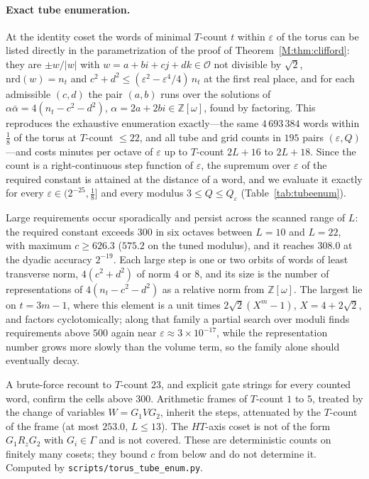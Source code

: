 \documentclass[aps,prx,twocolumn,superscriptaddress,nofootinbib,longbibliography]{revtex4-2}
\theoremstyle{plain}
\theoremstyle{definition}
\theoremstyle{remark}
\newcommand{\Z}{\mathbb{Z}}
\begin{document}
\paragraph{Exact tube enumeration.} At the identity coset the words of minimal $T$-count $t$ within $\varepsilon$ of the torus can be listed directly in the parametrization of the proof of Theorem~\ref{M:thm:clifford}: they are $\pm w/|w|$ with $w=a+bi+cj+dk\in\mathcal O$ not divisible by $\sqrt2$, $\mathrm{nrd}(w)=n_t$ and $c^2+d^2\le(\varepsilon^2-\varepsilon^4/4)\,n_t$ at the first real place, and for each admissible $(c,d)$ the pair $(a,b)$ runs over the solutions of $\alpha\bar\alpha=4(n_t-c^2-d^2)$, $\alpha=2a+2bi\in\Z[\omega]$, found by factoring. This reproduces the exhaustive enumeration exactly---the same $4\,693\,384$ words within $\tfrac18$ of the torus at $T$-count $\le22$, and all tube and grid counts in $195$ pairs $(\varepsilon,Q)$---and costs minutes per octave of $\varepsilon$ up to $T$-count $2L+16$ to $2L+18$. Since the count is a right-continuous step function of $\varepsilon$, the supremum over $\varepsilon$ of the required constant is attained at the distance of a word, and we evaluate it exactly for every $\varepsilon\in(2^{-25},\tfrac18]$ and every modulus $3\le Q\le Q_\varepsilon$ (Table~\ref{tab:tubeenum}). 

Large requirements occur sporadically and persist across the scanned range of $L$: the required constant exceeds $300$ in six octaves between $L=10$ and $L=22$, with maximum $c\ge626.3$ ($575.2$ on the tuned modulus), and it reaches $308.0$ at the dyadic accuracy $2^{-19}$. Each large step is one or two orbits of words of least transverse norm, $4(c^2+d^2)$ of norm $4$ or $8$, and its size is the number of representations of $4(n_t-c^2-d^2)$ as a relative norm from $\Z[\omega]$. The largest lie on $t=3m-1$, where this element is a unit times $2\sqrt2(X^m-1)$, $X=4+2\sqrt2$, and factors cyclotomically; along that family a partial search over moduli finds requirements above $500$ again near $\varepsilon\approx3\times10^{-17}$, while the representation number grows more slowly than the volume term, so the family alone should eventually decay. 

A brute-force recount to $T$-count $23$, and explicit gate strings for every counted word, confirm the cells above $300$. Arithmetic frames of $T$-count $1$ to $5$, treated by the change of variables $W=G_1VG_2$, inherit the steps, attenuated by the $T$-count of the frame (at most $253.0$, $L\le13$). The $HT$-axis coset is not of the form $G_1R_zG_2$ with $G_i\in\Gamma$ and is not covered. These are deterministic counts on finitely many cosets; they bound $c$ from below and do not determine it. Computed by \texttt{scripts/torus\_tube\_enum.py}.
\end{document}
